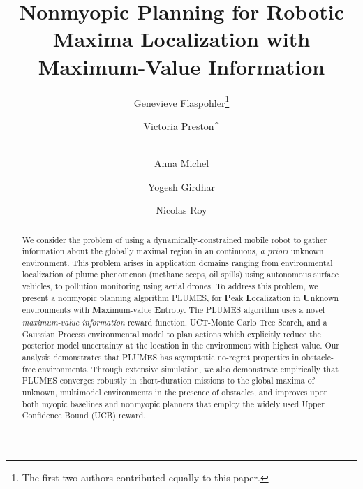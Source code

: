 \documentclass{styles/svproc}
\begin{document}
\mainmatter              %
%
\title{Nonmyopic Planning for Robotic Maxima Localization with Maximum-Value Information}  
%
%
\author{Genevieve Flaspohler\footnote{\label{ft:1} The first two authors contributed equally to this paper.} \and Victoria Preston^\footnotemark[\ref{ft:1}] \and \\
Anna Michel \and Yogesh Girdhar \and Nicolas Roy}
%
%
%
\maketitle              %
\begin{abstract}
We consider the problem of using a dynamically-constrained mobile robot to gather information about the globally maximal region in an continuous, \emph{a priori} unknown environment. This problem arises in application domains ranging from environmental localization of plume phenomenon (methane seeps, oil spills) using autonomous surface vehicles, to pollution monitoring using aerial drones. To address this problem, we present a nonmyopic planning algorithm PLUMES, for \textbf{P}eak \textbf{L}ocalization in \textbf{U}nknown environments with \textbf{M}aximum-value \textbf{E}ntropy. The PLUMES algorithm uses a novel \textit{maximum-value information} reward function, UCT-Monte Carlo Tree Search, and a Gaussian Process environmental model to plan actions which explicitly reduce the posterior model uncertainty at the location in the environment with highest value. Our analysis demonstrates that PLUMES has asymptotic no-regret properties in obstacle-free environments. Through extensive simulation, we also demonstrate empirically that PLUMES converges robustly in short-duration missions to the global maxima of unknown, multimodel environments in the presence of obstacles, and improves upon both myopic baselines and nonmyopic planners that employ the widely used Upper Confidence Bound (UCB) reward.
   
\end{abstract}
%
\end{document}
